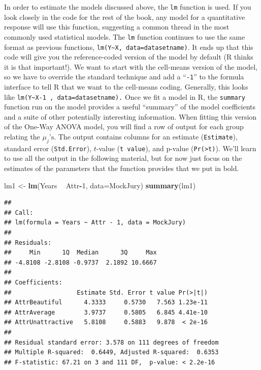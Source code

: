 \documentclass[]{book}
\newenvironment{Shaded}{\begin{snugshade}}{\end{snugshade}}
\newcommand{\KeywordTok}[1]{\textcolor[rgb]{0.13,0.29,0.53}{\textbf{#1}}}
\newcommand{\DataTypeTok}[1]{\textcolor[rgb]{0.13,0.29,0.53}{#1}}
\newcommand{\DecValTok}[1]{\textcolor[rgb]{0.00,0.00,0.81}{#1}}
\newcommand{\StringTok}[1]{\textcolor[rgb]{0.31,0.60,0.02}{#1}}
\newcommand{\OperatorTok}[1]{\textcolor[rgb]{0.81,0.36,0.00}{\textbf{#1}}}
\newcommand{\NormalTok}[1]{#1}
\theoremstyle{definition}
\theoremstyle{definition}
\theoremstyle{remark}
\begin{document}
In order to estimate the models discussed above, the \texttt{lm}
function is used. If you look closely in the code for the rest of the
book, any model for a quantitative response will use this function,
suggesting a common thread in the most commonly used statistical models.
The \texttt{lm} function continues to use the same format as previous
functions, \texttt{lm(Y\textasciitilde{}X,\ data=datasetname)}. It ends
up that this code will give you the reference-coded version of the model
by default (R thinks it is that important!). We want to start with the
cell-means version of the model, so we have to override the standard
technique and add a ``\texttt{-1}'' to the formula interface to tell R
that we want to the cell-means coding. Generally, this looks like
\texttt{lm(Y\textasciitilde{}X-1\ ,\ data=datasetname).} Once we fit a
model in R, the \texttt{summary} function run on the model provides a
useful ``summary'' of the model coefficients and a suite of other
potentially interesting information. When fitting this version of the
One-Way ANOVA model, you will find a row of output for each group
relating the \(\mu_j\text{'s}\). The output contains columns for an
estimate (\texttt{Estimate}), standard error (\texttt{Std.Error}),
\(t\)-value (\texttt{t\ value}), and p-value
(\texttt{Pr(\textgreater{}\textbar{}t\textbar{})}). We'll learn to use
all the output in the following material, but for now just focus on the
estimates of the parameters that the function provides that we put in
bold.

\begin{Shaded}
\begin{Highlighting}[]
\NormalTok{lm1 <-}\StringTok{ }\KeywordTok{lm}\NormalTok{(Years }\OperatorTok{~}\StringTok{ }\NormalTok{Attr}\OperatorTok{-}\DecValTok{1}\NormalTok{, }\DataTypeTok{data=}\NormalTok{MockJury)}
\KeywordTok{summary}\NormalTok{(lm1)}
\end{Highlighting}
\end{Shaded}

\begin{verbatim}
## 
## Call:
## lm(formula = Years ~ Attr - 1, data = MockJury)
## 
## Residuals:
##     Min      1Q  Median      3Q     Max 
## -4.8108 -2.8108 -0.9737  2.1892 10.6667 
## 
## Coefficients:
##                  Estimate Std. Error t value Pr(>|t|)
## AttrBeautiful      4.3333     0.5730   7.563 1.23e-11
## AttrAverage        3.9737     0.5805   6.845 4.41e-10
## AttrUnattractive   5.8108     0.5883   9.878  < 2e-16
## 
## Residual standard error: 3.578 on 111 degrees of freedom
## Multiple R-squared:  0.6449, Adjusted R-squared:  0.6353 
## F-statistic: 67.21 on 3 and 111 DF,  p-value: < 2.2e-16
\end{verbatim}
\end{document}
